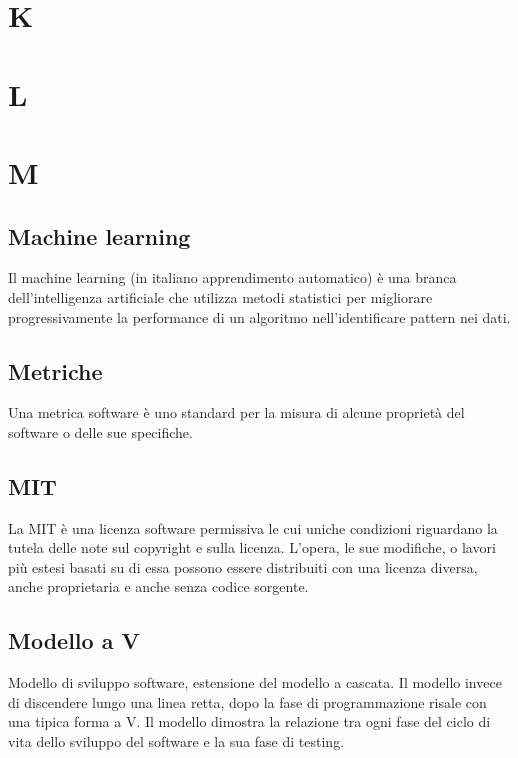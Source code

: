 \clearpage
\section*{K}

\clearpage
\section*{L}

\clearpage
\section*{M}

\subsection*{Machine learning}
Il machine learning (in italiano apprendimento automatico) è una branca dell'intelligenza artificiale che utilizza metodi statistici per migliorare progressivamente la performance di un algoritmo nell'identificare pattern nei dati. 

\subsection*{Metriche}
Una metrica software è uno standard per la misura di alcune proprietà del software o delle sue specifiche. 

\subsection*{MIT}
La MIT è una licenza software permissiva le cui uniche condizioni riguardano la tutela delle note sul copyright e sulla licenza. L'opera, le sue modifiche, o lavori più estesi basati su di essa possono essere distribuiti con una licenza diversa, anche proprietaria e anche senza codice sorgente. 

\subsection*{Modello a V}
Modello di sviluppo software, estensione del modello a cascata. Il modello invece di discendere lungo una linea retta, dopo la fase di programmazione risale con una tipica forma a V. Il modello dimostra la relazione tra ogni fase del ciclo di vita dello sviluppo del software e la sua fase di testing. 

